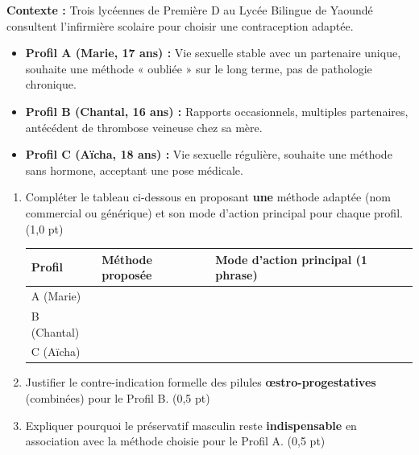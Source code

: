 \documentclass[11pt]{article}
\begin{document}
\begin{exercice}
\textbf{Contexte :} Trois lycéennes de Première D au Lycée Bilingue de Yaoundé consultent l'infirmière scolaire pour choisir une contraception adaptée.
\begin{itemize}
    \item \textbf{Profil A (Marie, 17 ans) :} Vie sexuelle stable avec un partenaire unique, souhaite une méthode « oubliée » sur le long terme, pas de pathologie chronique.
    \item \textbf{Profil B (Chantal, 16 ans) :} Rapports occasionnels, multiples partenaires, antécédent de thrombose veineuse chez sa mère.
    \item \textbf{Profil C (Aïcha, 18 ans) :} Vie sexuelle régulière, souhaite une méthode sans hormone, acceptant une pose médicale.
\end{itemize}

\begin{enumerate}
    \item Compléter le tableau ci-dessous en proposant \textbf{une} méthode adaptée (nom commercial ou générique) et son mode d'action principal pour chaque profil. (1,0 pt)
    \begin{tabular}{|p{2.2cm}|p{4.5cm}|p{4.5cm}|}
    \hline
    \textbf{Profil} & \textbf{Méthode proposée} & \textbf{Mode d'action principal (1 phrase)} \\ \hline
    A (Marie) & & \\ \hline
    B (Chantal) & & \\ \hline
    C (Aïcha) & & \\ \hline
    \end{tabular}
    \item Justifier le contre-indication formelle des pilules \textbf{œstro-progestatives} (combinées) pour le Profil B. (0,5 pt)
    \item Expliquer pourquoi le préservatif masculin reste \textbf{indispensable} en association avec la méthode choisie pour le Profil A. (0,5 pt)
\end{enumerate}
\end{exercice}
\end{document}
